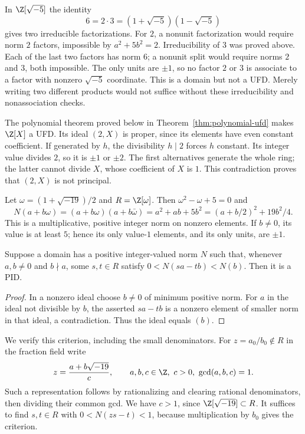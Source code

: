 In $\Z[\sqrt{-5}]$ the identity
\[
 6=2\cdot3=(1+\sqrt{-5})(1-\sqrt{-5})
\]
gives two irreducible factorizations. For $2$, a nonunit factorization
would require norm $2$ factors, impossible by $a^2+5b^2=2$.
Irreducibility of $3$ was proved above. Each of the last two factors has
norm $6$; a nonunit split would require norms $2$ and $3$, both
impossible. The only units are $\pm1$, so no factor $2$ or $3$ is
associate to a factor with nonzero $\sqrt{-5}$ coordinate.
This is a domain but not a UFD. Merely writing two different products
would not suffice without these irreducibility and nonassociation checks.

The polynomial theorem proved below in
Theorem~\ref{thm:polynomial-ufd} makes $\Z[X]$ a UFD.
Its ideal $(2,X)$ is proper, since its elements have even constant
coefficient. If generated by $h$, the divisibility $h\mid2$ forces
$h$ constant. Its integer value divides $2$, so it is $\pm1$ or $\pm2$.
The first alternatives generate the whole ring; the latter cannot divide
$X$, whose coefficient of $X$ is $1$. This contradiction proves that
$(2,X)$ is not principal.

Let $\omega=(1+\sqrt{-19})/2$ and $R=\Z[\omega]$.
Then $\omega^2-\omega+5=0$ and
\[
 N(a+b\omega)=(a+b\omega)(a+b\bar\omega)=a^2+ab+5b^2
 =(a+b/2)^2+19b^2/4 .
\]
This is a multiplicative, positive integer norm on nonzero elements.
If $b\ne0$, its value is at least $5$; hence its only value-$1$
elements, and its only units, are $\pm1$.

\begin{lemma}\label{lem:dedekind-hasse-sufficient}
Suppose a domain has a positive integer-valued norm $N$ such that,
whenever $a,b\ne0$ and $b\nmid a$, some $s,t\in R$ satisfy
$0<N(sa-tb)<N(b)$. Then it is a PID.
\end{lemma}
\begin{proof}
In a nonzero ideal choose $b\ne0$ of minimum positive norm.
For $a$ in the ideal not divisible by $b$, the asserted $sa-tb$ is
a nonzero element of smaller norm in that ideal, a contradiction.
Thus the ideal equals $(b)$.
\end{proof}
We verify this criterion, including the small denominators. For
$z=a_0/b_0\notin R$ in the fraction field write
\[
 z=\frac{a+b\sqrt{-19}}{c},\qquad
 a,b,c\in\Z,\ c>0,\ \gcd(a,b,c)=1 .
\]
Such a representation follows by rationalizing and clearing rational
denominators, then dividing their common gcd. We have $c>1$, since
$\Z[\sqrt{-19}]\subset R$. It suffices to find $s,t\in R$ with
$0<N(zs-t)<1$, because multiplication by $b_0$ gives the criterion.

